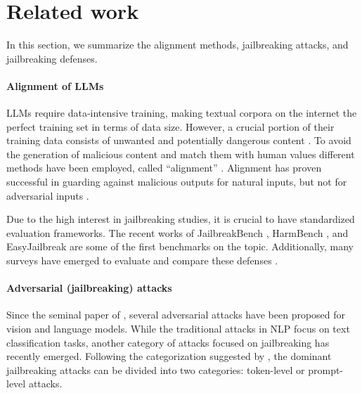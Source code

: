 \section{Related work}
In this section, we summarize the alignment methods, jailbreaking attacks, and jailbreaking defenses.

\paragraph{Alignment of LLMs}
\label{subsec:alignment}

LLMs require data-intensive training, making textual corpora on the internet the perfect training set in terms of data size. However, a crucial portion of their training data consists of unwanted and potentially dangerous content \citep{gehman2020realtoxicityprompts}. To avoid the generation of malicious content and match them with human values different methods have been employed, called ``alignment'' \citep{bai2022constitutional, hacker2023regulating, ouyang2022training, glaese2022improving, bai2022training, askell2021general}. Alignment has proven successful in guarding against malicious outputs for natural inputs, but not for adversarial inputs \citep{carlini2023are}.

Due to the high interest in jailbreaking studies, it is crucial to have standardized evaluation frameworks. The recent works of JailbreakBench \citep{chao2024jailbreakbench}, HarmBench \citep{mazeika2024harmbench}, and EasyJailbreak \citep{zhou2024easyjailbreak} are some of the first benchmarks on the topic. Additionally, many surveys have emerged to evaluate and compare these defenses \citep{xu2024llm, chu2024comprehensive, chowdhury2024breaking, liu2024jailbreaking, dong2024attacks}.

\paragraph{Adversarial (jailbreaking) attacks}
\label{subsec:attacks}

Since the seminal paper of \citet{Szegedy2014}, several adversarial attacks have been proposed for vision \citep{carlini2017towards,andriushchenko2020square,croce2020reliable} and language \citep{alzantot2018generating,Jin2020textfooler,guo2021gradient,hou2023textgrad} models. While the traditional attacks in NLP focus on text classification tasks, another category of attacks focused on jailbreaking has recently emerged. Following the categorization suggested by \citet{chao2023jailbreaking}, the dominant jailbreaking attacks can be divided into two categories: token-level or prompt-level attacks. 

